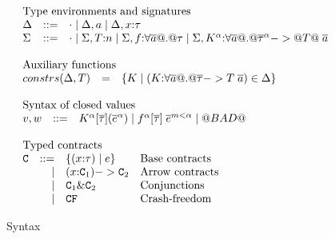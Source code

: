 \documentclass[preprint,nocopyrightspace]{sigplanconf}
\begin{document}
\begin{figure}
\[\begin{array}{l}
\begin{array}{lrll}
\multicolumn{3}{l}{\text{Type environments and signatures}} \\
\Delta & ::=  & \cdot \mid \Delta,a \mid \Delta,x{:}\tau \\
\Sigma & ::=  & \cdot \mid \Sigma,T{:}n \mid \Sigma,f{:}\forall\ol{a} @.@ \tau \mid \Sigma,K^{\ar}{:}\forall\ol{a} @.@ \oln{\tau}{\ar} -> @T@\;\as
\end{array}\\ \\
\begin{array}{lrll}
\multicolumn{3}{l}{\text{Auxiliary functions}} \\
constrs(\Delta,T) & = & \{ K \mid (K{:}\forall \as @.@ \taus -> T\;\as) \in \Delta \} \\
\end{array}\\ \\ 
\begin{array}{lrll}
\multicolumn{3}{l}{\text{Syntax of closed values}} \\
 v,w & ::= & K^\ar[\ol{\tau}](\oln{e}{\ar}) \mid f^\ar[\ol{\tau}]\;\oln{e}{m < \ar} \mid @BAD@ \\ \\ 
\end{array} \\
\begin{array}{lrll}
\multicolumn{3}{l}{\text{Typed contracts}} \\
\Ct & ::=  & \{ (x{:}\tau) \mid e \}    & \text{Base contracts} \\ 
  & \mid &  (x{:}\Ct_1) -> \Ct_2        & \text{Arrow contracts} \\ 
  & \mid & \Ct_1 \& \Ct_2               & \text{Conjunctions}    \\ 
  & \mid & \CF                          & \text{Crash-freedom}  \\
\end{array}
\end{array}\]
\caption{Syntax}\label{fig:syntax}
\end{figure}
\end{document}
